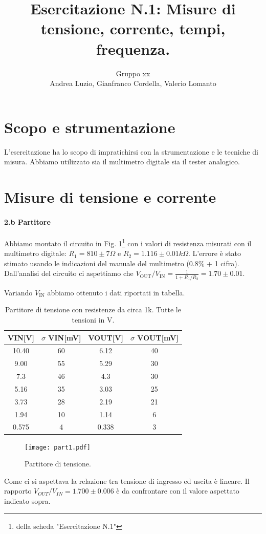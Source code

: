 \documentclass[10pt,a4paper]{article}
\author{Gruppo xx \\ Andrea Luzio, Gianfranco Cordella, Valerio Lomanto}
\title{Esercitazione N.1: Misure di tensione, corrente, tempi, frequenza.}
\begin{document}
\maketitle

\section{Scopo e strumentazione}

L'esercitazione ha lo scopo di impratichirsi con la strumentazione e le tecniche di misura. 
Abbiamo utilizzato sia il multimetro digitale sia il tester analogico. 

\section{Misure di tensione e corrente}
\paragraph{2.b Partitore}
Abbiamo montato il circuito in Fig. 1\footnote{della scheda "Esercitazione N.1"} con i valori di resistenza misurati con il multimetro digitale: $R_1 = 810\pm 7 \Omega$ e $R_2 = 1.116\pm 0.01 k\Omega$. L'errore \`e stato stimato usando le indicazioni del manuale del multimetro ($0.8\%$ + 1 cifra). 
Dall'analisi del circuito ci aspettiamo che $V_\mathrm{OUT}/V_\mathrm{IN} = \frac{1}{1+R_1/R_2}= 1.70 \pm 0.01  $.


Variando $V_\mathrm{IN}$ abbiamo ottenuto i dati riportati in tabella.

\begin{table}[h]
\centering
\begin{tabular}{|c|c|c|c|}
\hline 
VIN[V]& $\sigma$ VIN[mV] &VOUT[V]	 & $\sigma$ VOUT[mV] \\
\hline 
10.40 & 60 & 6.12 & 40 \\
9.00 & 55 & 5.29 & 30 \\
7.3 & 46 & 4.3 & 30 \\
5.16 & 35 & 3.03 & 25 \\
3.73 & 28 & 2.19 & 21 \\
1.94 & 10 & 1.14 & 6 \\
0.575 & 4 & 0.338 & 3 \\
\hline 
\end{tabular} 
\caption{Partitore di tensione con resistenze da circa 1k. Tutte le tensioni in V.\label{t:par1}}
\end{table}
\begin{figure}
\centering
\texttt{[image: part1.pdf]}
\caption{Partitore di tensione.\label{f:par1}}
\end{figure}
Come ci si aspettava la relazione tra tensione di ingresso ed uscita \`e lineare. Il rapporto $V_{OUT}/V_{IN}=1.700 \pm 0.006$ \`e da confrontare con il valore aspettato indicato sopra.
\end{document}
